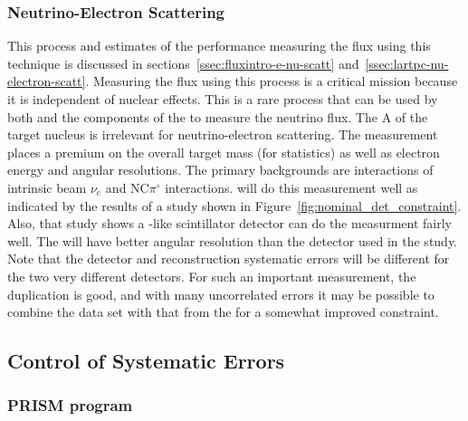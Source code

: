 \subsubsection{Neutrino-Electron Scattering}
This process and estimates of the   performance measuring the flux using this technique is discussed in sections~\ref{ssec:fluxintro-e-nu-scatt} and~\ref{ssec:lartpc-nu-electron-scatt}.  Measuring the flux using this process is a critical  mission because it is independent of nuclear effects.  This is a rare process that can be used by both  and the  components of the  to measure the neutrino flux.  The A of the target nucleus is irrelevant for neutrino-electron scattering.  The measurement places a premium on the overall target mass (for statistics) as well as electron energy and angular resolutions.  The primary backgrounds are  interactions of intrinsic beam $\nu_{e}$ and NC$\pi^{\circ}$ interactions.   will do this measurement well as indicated by the results of a study shown in Figure~\ref{fig:nominal_det_constraint}.  Also, that study shows a -like scintillator detector can do the measurment fairly well.  The  will have better angular resolution than the detector used in the study. Note that the detector and reconstruction systematic errors will be different for the two very different detectors.  For such an important measurement, the duplication is good, and with many uncorrelated errors it may be possible to combine the  data set with that from the  for a somewhat improved constraint. 


\subsection{Control of Systematic Errors}


\subsubsection{PRISM program}

